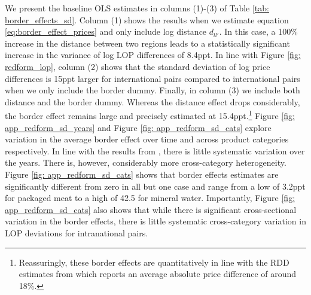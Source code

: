 We present the baseline OLS estimates in columns (1)-(3) of Table \ref{tab: border_effects_sd}. Column (1) shows the results when we estimate equation \ref{eq:border_effect_prices} and only include log distance $d_{ll'}$. In this case, a 100\% increase in the distance between two regions leads to a statistically significant increase in the variance of log LOP differences of 8.4ppt. In line with Figure \ref{fig: redform_lop}, column (2) shows that the standard deviation of log price differences is 15ppt larger for international pairs compared to international pairs when we only include the border dummy. Finally, in column (3) we include both distance and the border dummy. Whereas the distance effect drops considerably, the border effect remains large and precisely estimated at 15.4ppt.\footnote{Reassuringly, these border effects are quantitatively in line with the RDD estimates from \citet{Beck2020} which reports an average absolute price difference of around 18\%.} Figure \ref{fig: app_redform_sd_years} and Figure \ref{fig: app_redform_sd_cats} explore variation in the average border effect over time and across product categories respectively. In line with the results from \citet{Beck2020}, there is little systematic variation over the years. There is, however, considerably more cross-category heterogeneity. Figure \ref{fig: app_redform_sd_cats} shows that border effects estimates are significantly different from zero in all but one case and range from a low of 3.2ppt for packaged meat to a high of 42.5 for mineral water. Importantly, Figure \ref{fig: app_redform_sd_cats} also shows that while there is significant cross-sectional variation in the border effects, there is little systematic cross-category variation in LOP deviations for intranational pairs.

